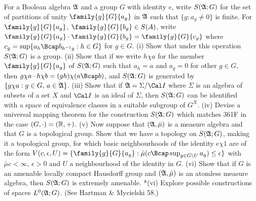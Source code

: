{
For a Boolean algebra $\frak A$ and a group $G$ with
identity $e$, write $S(\frak A;G)$ for the set of partitions of unity
$\family{g}{G}{a_g}$ in $\frak A$ such that $\{g:a_g\ne 0\}$ is finite.
For $\family{g}{G}{a_g}$, $\family{g}{G}{b_g}\in S(A)$, write
$\family{g}{G}{a_g}\cdot\family{g}{G}{b_g}=\family{g}{G}{c_g}$ where
$c_g=\sup\{a_h\Bcap b_{h^{-1}g}:h\in G\}$ for $g\in G$.   (i) Show that
under this operation $S(\frak A;G)$ is a group.   (ii) Show that if we
write $h\chi a$ for the member $\family{g}{G}{a_g}$ of $S(\frak A;G)$
such that $a_h=a$ and $a_g=0$ for other $g\in G$, then
$g\chi a\cdot h\chi b=(gh)\chi(a\Bcap b)$, and $S(\frak A;G)$ is
generated by $\{g\chi a:g\in G,\,a\in\frak A\}$.   (iii) Show that if
$\frak A=\Sigma/\Cal I$ where $\Sigma$ is an algebra of subsets of a set
$X$ and $\Cal I$ is an ideal of $\Sigma$, then $S(\frak A;G)$ can be
identified with a space of equivalence classes in a suitable subgroup of
$G^X$.   (iv) Devise a universal mapping theorem for the construction
$S(\frak A;G)$ which matches 361F in the case $(G,\cdot)=(\Bbb R,+)$.
(v) Now suppose that
$(\frak A,\bar\mu)$ is a measure algebra and that $G$ is a topological
group.   Show that we have a topology on $S(\frak A;G)$,
making it a topological group,
for which basic neighbourhoods of the identity
$e\chi 1$ are of the form $V(c,\epsilon,U)=\{\family{g}{G}{a_g}:
\bar\mu(c\Bcap\sup_{g\in G\setminus U}a_g)\le\epsilon\}$ with
$\bar\mu c<\infty$, $\epsilon>0$ and $U$ a neighbourhood of the identity
in $G$.   (vi) Show that if $G$ is an amenable locally compact Hausdorff
group and $(\frak A,\bar\mu)$ is an atomless measure algebra, then
$S(\frak A;G)$ is extremely amenable.   
*(vi) Explore possible constructions of spaces $L^0(\frak A;G)$.
(See {\smc Hartman \& Mycielski 58}.)

}%

